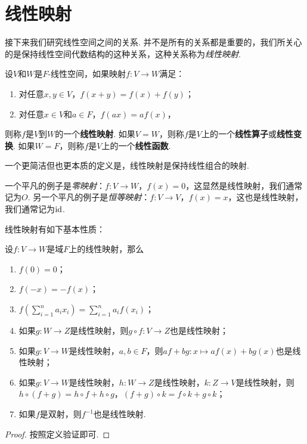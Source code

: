 \section{线性映射}

接下来我们研究线性空间之间的关系. 并不是所有的关系都是重要的，我们所关心的是保持线性空间代数结构的这种关系，这种关系称为\textit{线性映射}. 

\begin{definition}
设$V$和$W$是$F$-线性空间，如果映射$f:V\to W$满足：
\begin{enumerate}
    \item 对任意$x,y\in V$，$f(x+y)=f(x)+f(y)$；
    \item 对任意$x\in V$和$a\in F$，$f(ax)=af(x)$，
\end{enumerate}
则称$f$是$V$到$W$的一个\textbf{线性映射}. 如果$V=W$，则称$f$是$V$上的一个\textbf{线性算子}或\textbf{线性变换}. 如果$W=F$，则称$f$是$V$上的一个\textbf{线性函数}.
\end{definition}

一个更简洁但也更本质的定义是，线性映射是保持线性组合的映射. 

\begin{example}
一个平凡的例子是\textit{零映射}：$f:V\to W$，$f(x)=0$，这显然是线性映射，我们通常记为$O$. 另一个平凡的例子是\textit{恒等映射}：$f:V\to V$，$f(x)=x$，这也是线性映射，我们通常记为$\mathrm{id}$.
\end{example}

线性映射有如下基本性质：

\begin{proposition}\label{proposition:linear-map-basic}
设$f:V\to W$是域$F$上的线性映射，那么
\begin{enumerate}
    \item $f(0)=0$；
    \item $f(-x)=-f(x)$；
    \item $f(\sum_{i=1}^n a_ix_i)=\sum_{i=1}^n a_if(x_i)$；
    \item 如果$g:W\to Z$是线性映射，则$g\circ f:V\to Z$也是线性映射；
    \item 如果$g:V\to W$是线性映射，$a,b\in F$，则$af+bg:x\mapsto af(x)+bg(x)$也是线性映射；
    \item 如果$g:V\to W$是线性映射，$h:W\to Z$是线性映射，$k:Z\to V$是线性映射，则$h\circ(f+g)=h\circ f+h\circ g$，$(f+g)\circ k = f\circ k+g\circ k$；
    \item 如果$f$是双射，则$f^{-1}$也是线性映射. 
\end{enumerate}
\end{proposition}
\begin{proof}
    按照定义验证即可. 
\end{proof}

